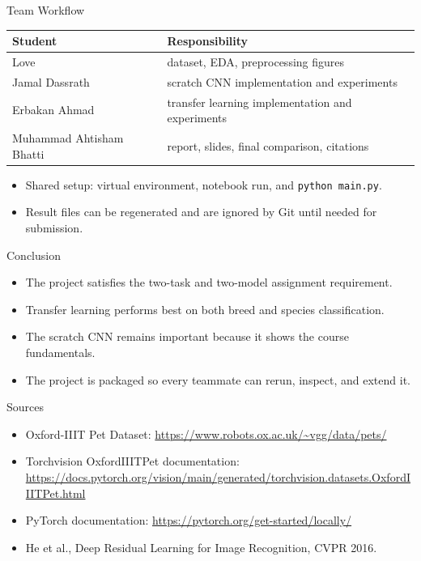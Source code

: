 \documentclass[aspectratio=169]{beamer}
\begin{document}
\begin{frame}{Team Workflow}
\begin{center}
\begin{tabular}{ll}
\toprule
Student & Responsibility \\
\midrule
Love & dataset, EDA, preprocessing figures \\
Jamal Dassrath & scratch CNN implementation and experiments \\
Erbakan Ahmad & transfer learning implementation and experiments \\
Muhammad Ahtisham Bhatti & report, slides, final comparison, citations \\
\bottomrule
\end{tabular}
\end{center}
\vspace{0.3cm}
\begin{itemize}
    \item Shared setup: virtual environment, notebook run, and \texttt{python main.py}.
    \item Result files can be regenerated and are ignored by Git until needed for submission.
\end{itemize}
\end{frame}

\begin{frame}{Conclusion}
\begin{itemize}
    \item The project satisfies the two-task and two-model assignment requirement.
    \item Transfer learning performs best on both breed and species classification.
    \item The scratch CNN remains important because it shows the course fundamentals.
    \item The project is packaged so every teammate can rerun, inspect, and extend it.
\end{itemize}
\end{frame}

\begin{frame}{Sources}
\begin{itemize}
    \item Oxford-IIIT Pet Dataset: \url{https://www.robots.ox.ac.uk/~vgg/data/pets/}
    \item Torchvision OxfordIIITPet documentation: \url{https://docs.pytorch.org/vision/main/generated/torchvision.datasets.OxfordIIITPet.html}
    \item PyTorch documentation: \url{https://pytorch.org/get-started/locally/}
    \item He et al., Deep Residual Learning for Image Recognition, CVPR 2016.
\end{itemize}
\end{frame}
\end{document}
